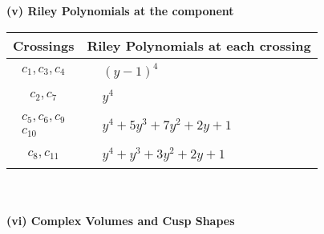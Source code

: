 \documentclass[1p]{elsarticle_modified}
\theoremstyle{definition}
\begin{document}
\newpage\renewcommand{\arraystretch}{1}
\flushleft \textbf{(v) Riley Polynomials at the component}\newline \\
\begin{tabular}{m{50pt}|m{274pt}}
Crossings & \hspace{64pt}Riley Polynomials at each crossing \\
\hline $$\begin{aligned}c_{1},c_{3},c_{4}\end{aligned}$$&$\begin{aligned}
&(y-1)^4
\end{aligned}$\\
\hline $$\begin{aligned}c_{2},c_{7}\end{aligned}$$&$\begin{aligned}
&y^4
\end{aligned}$\\
\hline $$\begin{aligned}c_{5},c_{6},c_{9}\\c_{10}\end{aligned}$$&$\begin{aligned}
&y^4+5 y^3+7 y^2+2 y+1
\end{aligned}$\\
\hline $$\begin{aligned}c_{8},c_{11}\end{aligned}$$&$\begin{aligned}
&y^4+y^3+3 y^2+2 y+1
\end{aligned}$\\
\hline
\end{tabular}\\~\\
\newpage\flushleft \textbf{(vi) Complex Volumes and Cusp Shapes}
\end{document}

